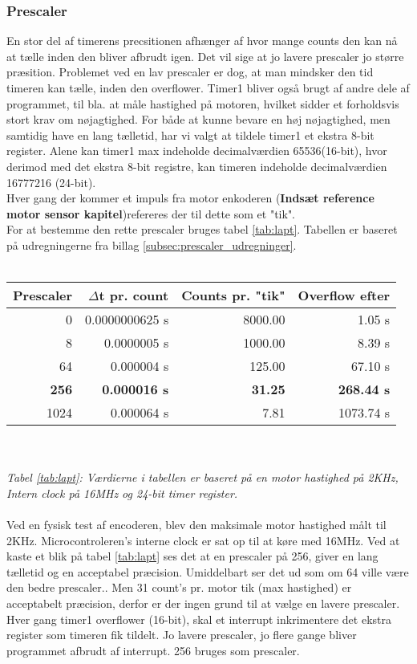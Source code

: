 \subsubsection{Prescaler}
En stor del af timerens precsitionen afhænger af hvor mange counts den kan nå at tælle inden den bliver afbrudt igen. Det vil sige at jo lavere prescaler jo større præsition. Problemet ved en lav prescaler er dog, at man mindsker den tid timeren kan tælle, inden den overflower. Timer1 bliver også brugt af andre dele af programmet, til bla. at måle hastighed på motoren, hvilket sidder et forholdsvis stort krav om nøjagtighed. For både at kunne bevare en høj nøjagtighed, men samtidig have en lang tælletid, har vi valgt at tildele timer1 et ekstra 8-bit register. Alene kan timer1 max indeholde decimalværdien 65536(16-bit), hvor derimod med det ekstra 8-bit registre, kan timeren indeholde decimalværdien 16777216 (24-bit).\\
Hver gang der kommer et impuls fra motor enkoderen (\textbf{Indsæt reference motor sensor kapitel})refereres der til dette som et "tik".\\
For at bestemme den rette prescaler bruges tabel \ref{tab:lapt}. Tabellen er baseret på udregningerne fra billag \ref{subsec:prescaler_udregninger}.\\
\\
\begin{tabular}{ | r | r | r | r | }
	\hline
	Prescaler 		& $\Delta$t pr. count 	& Counts pr. "tik"	&	Overflow efter		\\
	\hline
	0 				& 	 	0.0000000625 s	&  		8000.00		&		1.05 s			\\
	\hline	
	8 				& 	 	0.0000005 s		&  		1000.00		&		8.39 s			\\
	\hline
	64 				& 	 	0.000004 s		&  		125.00		&		67.10 s			\\
	\hline
	\textbf{256} 	& \textbf{0.000016 s}	&  	\textbf{31.25}	&	\textbf{268.44 s}	\\
	\hline
	1024 			& 	 	0.000064 s		&  		7.81		&		1073.74 s		\\
	\hline
\end{tabular}
\label{tab:lapt}
\\
\\
\textsl{\small Tabel \ref{tab:lapt}: Værdierne i tabellen er baseret på en motor hastighed på 2KHz, Intern clock på 16MHz og 24-bit timer register.}\\
\\
Ved en fysisk test af encoderen, blev den maksimale motor hastighed målt til 2KHz.
Microcontroleren's interne clock er sat op til at køre med 16MHz. Ved at kaste et blik på tabel \ref{tab:lapt} ses det at en prescaler på 256, giver en lang tælletid og en acceptabel præcision. Umiddelbart ser det ud som om 64 ville være den bedre prescaler.. 
Men 31 count's pr. motor tik (max hastighed) er acceptabelt præcision, derfor er der ingen grund til at vælge en lavere prescaler. Hver gang timer1 overflower (16-bit), skal et interrupt inkrimentere det ekstra register som timeren fik tildelt. Jo lavere prescaler, jo flere gange bliver programmet afbrudt af interrupt. 256 bruges som prescaler.




